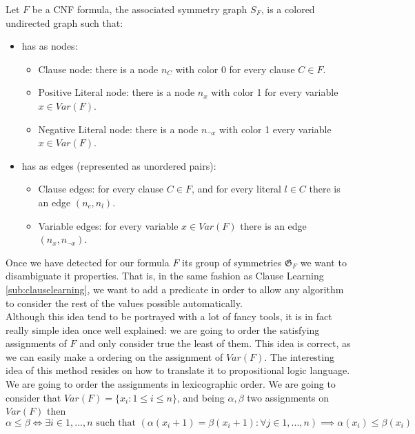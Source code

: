 \begin{definition}
  Let $F$ be a CNF formula, the associated symmetry graph $S_F$, is a colored undirected graph such that:
  \begin{itemize}
  \item has as nodes:
    \begin{itemize}
    \item Clause node: there is a node $n_C$ with color 0 for every clause $C \in F$.
    \item Positive Literal node: there is a node $n_x$ with color 1 for every variable $x\in Var(F)$.
    \item Negative Literal node: there is a node $n_{\neg x}$ with color 1 every variable $x\in Var(F)$.
    \end{itemize}
  \item has as edges (represented as unordered pairs):
    \begin{itemize}
    \item Clause edges: for every clause $C\in F$, and for every literal $l\in C$ there is an edge $(n_c, n_l)$.
    \item Variable edges: for every variable $x\in Var(F)$ there is an edge $(n_x,n_{\neg x})$.
    \end{itemize}
  \end{itemize}
\end{definition}





Once we have detected for our formula $F$  its group of symmetries $\mathfrak{G}_F$ we want to disambiguate it properties. That is, in the same fashion as Clause Learning \ref{sub:clauselearning}, we want to add a predicate in order to allow any algorithm to consider the rest of the values possible automatically.\\

Although this idea tend to be portrayed with a lot of fancy tools, it is in fact really simple idea once well explained: we are going to order the satisfying assignments of $F$ and only consider true the least of them. This idea is correct, as we can easily make a ordering on the assignment of $Var(F)$. The interesting idea of this method resides on how to translate it to propositional logic language.\\

We are going to order the assignments in  lexicographic order. We are going to consider that $Var(F) = \{x_i : 1 \le i \le n\}$, and being $\alpha, \beta$ two assignments on $Var(F)$ then
$$\alpha \le \beta \iff \exists i \in 1,...,n \text{ such that }  (\alpha(x_i+1) = \beta(x_i+1):\forall j \in 1,...,n  ) \implies\alpha( x_i) \le\beta (x_i)  $$

